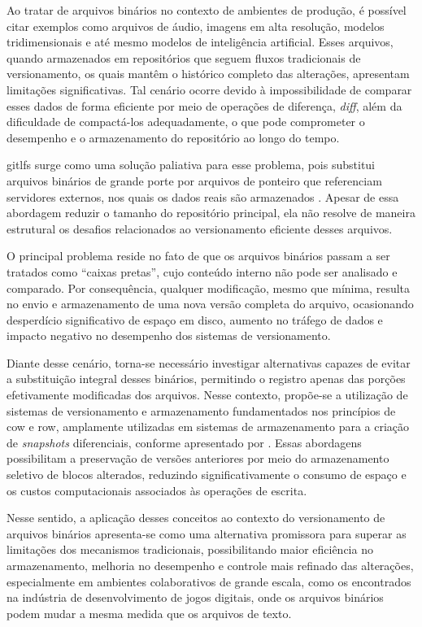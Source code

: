 Ao tratar de arquivos binários no contexto de ambientes de produção, é possível citar exemplos como arquivos de áudio, imagens em alta resolução, modelos tridimensionais e até mesmo modelos de inteligência artificial. Esses arquivos, quando armazenados em repositórios que seguem fluxos tradicionais de versionamento, os quais mantêm o histórico completo das alterações, apresentam limitações significativas. Tal cenário ocorre devido à impossibilidade de comparar esses dados de forma eficiente por meio de operações de diferença, \textit{diff}, além da dificuldade de compactá-los adequadamente, o que pode comprometer o desempenho e o armazenamento do repositório ao longo do tempo.

\gls{gitlfs} surge como uma solução paliativa para esse problema, pois substitui arquivos binários de grande porte por arquivos de ponteiro que referenciam servidores externos, nos quais os dados reais são armazenados \cite{Chen2025}. Apesar de essa abordagem reduzir o tamanho do repositório principal, ela não resolve de maneira estrutural os desafios relacionados ao versionamento eficiente desses arquivos.

O principal problema reside no fato de que os arquivos binários passam a ser tratados como “caixas pretas”, cujo conteúdo interno não pode ser analisado e comparado. Por consequência, qualquer modificação, mesmo que mínima, resulta no envio e armazenamento de uma nova versão completa do arquivo, ocasionando desperdício significativo de espaço em disco, aumento no tráfego de dados e impacto negativo no desempenho dos sistemas de versionamento.

Diante desse cenário, torna-se necessário investigar alternativas capazes de evitar a substituição integral desses binários, permitindo o registro apenas das porções efetivamente modificadas dos arquivos. Nesse contexto, propõe-se a utilização de sistemas de versionamento e armazenamento fundamentados nos princípios de \gls{cow} e \gls{row}, amplamente utilizadas em sistemas de armazenamento para a criação de \textit{snapshots} diferenciais, conforme apresentado por \cite{Xiao2009}. Essas abordagens possibilitam a preservação de versões anteriores por meio do armazenamento seletivo de blocos alterados, reduzindo significativamente o consumo de espaço e os custos computacionais associados às operações de escrita.

Nesse sentido, a aplicação desses conceitos ao contexto do versionamento de arquivos binários apresenta-se como uma alternativa promissora para superar as limitações dos mecanismos tradicionais, possibilitando maior eficiência no armazenamento, melhoria no desempenho e controle mais refinado das alterações, especialmente em ambientes colaborativos de grande escala, como os encontrados na indústria de desenvolvimento de jogos digitais, onde os arquivos binários podem mudar a mesma medida que os arquivos de texto.
